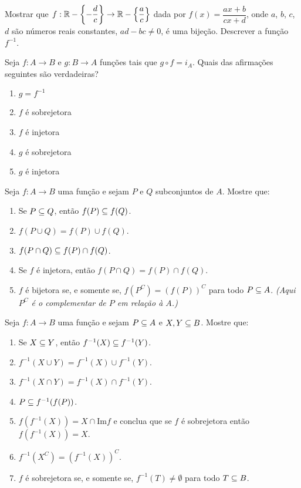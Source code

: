 \documentclass[12pt]{exam}
\begin{document}
\vspace{.3cm}

\questao{} Mostrar que $f : \mathbb{R} - \left\{-\dfrac{d}{c}\right\} \to \mathbb{R}  - \left\{\dfrac{a}{c}\right\}$ dada por $f(x) =  \dfrac{ax + b}{cx + d}$, onde $a$, $b$, $c$, $d$ s{\~a}o n{\'u}meros reais constantes, $ad - bc \ne 0$, {\'e} uma bije{\c c}{\~a}o. Descrever a fun{\c c}{\~a}o $f^{-1}$.

\vspace{.3cm}

\questao{} Seja $f : A \to B$ e $g : B \to A$ fun\c{c}\~oes tais que $g \circ f = i_A$. Quais das afirma\c{c}\~oes seguintes s\~ao verdadeiras?
\begin{enumerate}[label={\alph*})]
    \item $g = f^{-1}$
    \item $f$ \'e sobrejetora
    \item $f$ \'e injetora
    \item $g$ \'e sobrejetora
    \item $g$ \'e injetora
\end{enumerate}


\vspace{.3cm}

\questao{} Seja $f : A \to B$ uma fun\c{c}\~ao e sejam $P$ e $Q$ subconjuntos de $A$. Mostre que:
\begin{enumerate}[label={\alph*})]
    \item Se $P\subseteq Q$, ent{\~a}o $f(P)\subseteq f(Q)$.
    \item $f(P\cup Q) = f(P)\cup f(Q)$.
    \item $f(P\cap Q)\subseteq f(P)\cap f(Q)$.
    \item Se $f$ {\'e} injetora, ent{\~a}o $f(P\cap Q) =  f(P)\cap f(Q)$.
    \item $f$ {\'e} bijetora se, e somente se, $f(P^C) = (f(P))^C$ para todo $P \subseteq A$. \textit{(Aqui $P^C$ \'e o complementar de $P$ em rela\c{c}\~ao \`a $A$.)}
\end{enumerate}

\vspace{.3cm}

\questao{} Seja $f : A \to B$ uma fun{\c c}{\~a}o e sejam $P \subseteq
A$ e $X, Y\subseteq B$. Mostre que:
\begin{enumerate}[label={\alph*})]
    \item Se $X\subseteq Y$, ent{\~a}o $f^{-1}(X)\subseteq f^{-1}(Y)$.
    \item $f^{-1}(X\cup Y)=f^{-1}(X)\cup f^{-1}(Y)$.
    \item $f^{-1}(X\cap Y)= f^{-1}(X)\cap f^{-1}(Y)$.
    \item $P\subseteq f^{-1}(f(P))$.
    \item $f(f^{-1}(X))= X \cap \mbox{Im}f$ e conclua que se $f$ {\'e} sobrejetora ent{\~a}o
    $f(f^{-1}(X))=X$.
    \item $f^{-1}(X^C) = (f^{-1}(X))^C$.
    \item $f$ \'e sobrejetora se, e somente se, $f^{-1}(T) \ne \emptyset$ para todo $T \subseteq B$.
\end{enumerate}
\end{document}
